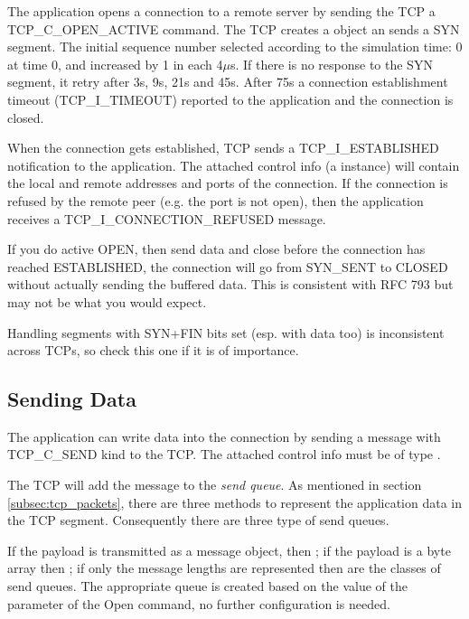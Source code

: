 The application opens a connection to a remote server by sending the TCP
a TCP\_C\_OPEN\_ACTIVE command. The TCP creates a 
object an sends a SYN segment. The initial sequence number selected according
to the simulation time: 0 at time 0, and increased by 1 in each 4$\mu$s.
If there is no response to the SYN segment, it retry after 3s, 9s, 21s and
45s. After 75s a connection establishment timeout (TCP\_I\_TIMEOUT) reported
to the application and the connection is closed.

When the connection gets established, TCP sends a TCP\_I\_ESTABLISHED
notification to the application. The attached control info
(a  instance)
will contain the local and remote addresses and ports of the connection.
If the connection is refused by the remote peer (e.g. the port is not open),
then the application receives a TCP\_I\_CONNECTION\_REFUSED message.

\begin{note}
If you do active OPEN, then send data and close before the connection
has reached ESTABLISHED, the connection will go from SYN\_SENT to CLOSED
without actually sending the buffered data. This is consistent with
RFC 793 but may not be what you would expect.
\end{note}

\begin{note}
Handling segments with SYN+FIN bits set (esp. with data too) is
inconsistent across TCPs, so check this one if it is of importance.
\end{note}

\subsection{Sending Data}

The application can write data into the connection
by sending a message with TCP\_C\_SEND kind to the TCP.
The attached control info must be of type .

The TCP will add the message to the \emph{send queue}.
As mentioned in section \ref{subsec:tcp_packets}, there are three methods
to represent the application data in the TCP segment.
Consequently there are three type of send queues.
 
If the payload is transmitted as a message
object, then ;
if the payload is a byte array then ;
if only the message lengths are represented then 
are the classes of send queues. The appropriate queue is created based
on the value of the  parameter of the Open command, no
further configuration is needed.

